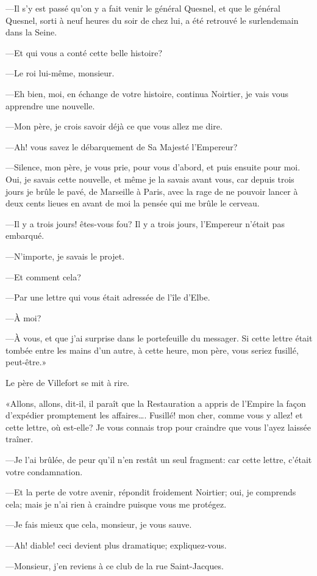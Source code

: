 —Il s'y est passé qu'on y a fait venir le général Quesnel, et que le général Quesnel, sorti à neuf heures du soir de chez lui, a été retrouvé le surlendemain dans la Seine.

—Et qui vous a conté cette belle histoire?

—Le roi lui-même, monsieur.

—Eh bien, moi, en échange de votre histoire, continua Noirtier, je vais vous apprendre une nouvelle.

—Mon père, je crois savoir déjà ce que vous allez me dire.

—Ah! vous savez le débarquement de Sa Majesté l'Empereur?

—Silence, mon père, je vous prie, pour vous d'abord, et puis ensuite pour moi. Oui, je savais cette nouvelle, et même je la savais avant vous, car depuis trois jours je brûle le pavé, de Marseille à Paris, avec la rage de ne pouvoir lancer à deux cents lieues en avant de moi la pensée qui me brûle le cerveau.

—Il y a trois jours! êtes-vous fou? Il y a trois jours, l'Empereur n'était pas embarqué.

—N'importe, je savais le projet.

—Et comment cela?

—Par une lettre qui vous était adressée de l'île d'Elbe.

—À moi?

—À vous, et que j'ai surprise dans le portefeuille du messager. Si cette lettre était tombée entre les mains d'un autre, à cette heure, mon père, vous seriez fusillé, peut-être.»

Le père de Villefort se mit à rire.

«Allons, allons, dit-il, il paraît que la Restauration a appris de l'Empire la façon d'expédier promptement les affaires\dots. Fusillé! mon cher, comme vous y allez! et cette lettre, où est-elle? Je vous connais trop pour craindre que vous l'ayez laissée traîner.

—Je l'ai brûlée, de peur qu'il n'en restât un seul fragment: car cette lettre, c'était votre condamnation.

—Et la perte de votre avenir, répondit froidement Noirtier; oui, je comprends cela; mais je n'ai rien à craindre puisque vous me protégez.

—Je fais mieux que cela, monsieur, je vous sauve.

—Ah! diable! ceci devient plus dramatique; expliquez-vous.

—Monsieur, j'en reviens à ce club de la rue Saint-Jacques.

